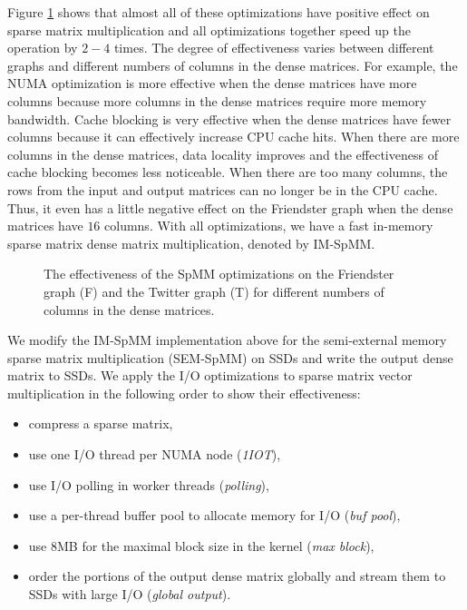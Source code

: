 Figure \ref{perf:spmm_opt} shows that almost all of these optimizations have
positive effect on sparse matrix multiplication and all optimizations
together speed up the operation by $2-4$ times. The degree of effectiveness
varies between different graphs and different numbers of columns in
the dense matrices. For example, the NUMA optimization is more effective when
the dense matrices have more columns because more columns in the dense matrices
require more memory bandwidth. Cache blocking is very effective when
the dense matrices have fewer columns because it can effectively increase CPU
cache hits. When there are more columns in the dense matrices, data locality
improves and the effectiveness of cache blocking becomes less noticeable.
When there are too many columns, the rows from
the input and output matrices can no longer be in the CPU cache. Thus, it even
has a little negative effect on the Friendster graph when the dense matrices
have $16$ columns. With all optimizations, we have a fast in-memory sparse
matrix dense matrix multiplication, denoted by IM-SpMM.


\begin{figure}
	\begin{center}
		\footnotesize
		
		\caption{The effectiveness of the SpMM optimizations on the Friendster
			graph (F) and the Twitter graph (T) for different numbers of
			columns in the dense matrices.}
		\label{perf:spmm_opt}
	\end{center}
\end{figure}

We modify the IM-SpMM implementation above for the semi-external memory sparse
matrix multiplication (SEM-SpMM) on SSDs and write the output dense matrix to
SSDs. We apply the I/O optimizations to sparse matrix vector multiplication
in the following order to show their effectiveness:
\begin{itemize} \itemsep1pt \parskip0pt 
	\item compress a sparse matrix,
	\item use one I/O thread per NUMA node (\textit{1IOT}),
	\item use I/O polling in worker threads (\textit{polling}),
	\item use a per-thread buffer pool to allocate memory for I/O
		(\textit{buf pool}),
	\item use 8MB for the maximal block size in the kernel (\textit{max block}),
	\item order the portions of the output dense matrix globally and stream them
		to SSDs with large I/O (\textit{global output}).
\end{itemize}

